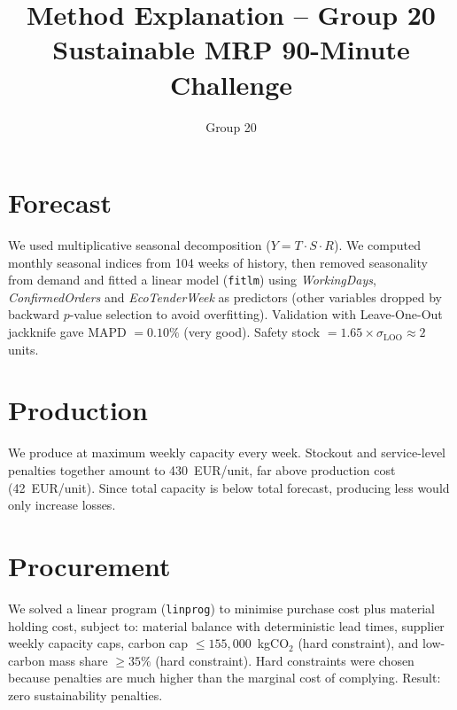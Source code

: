 \documentclass[11pt,a4paper]{article}
\title{Method Explanation -- Group 20\\
\large Sustainable MRP 90-Minute Challenge}
\author{Group 20}
\date{}
\begin{document}
\maketitle

\section*{Forecast}
We used multiplicative seasonal decomposition ($Y = T \cdot S \cdot R$).
We computed monthly seasonal indices from 104 weeks of history, then removed seasonality
from demand and fitted a linear model (\texttt{fitlm}) using \textit{WorkingDays},
\textit{ConfirmedOrders} and \textit{EcoTenderWeek} as predictors (other variables dropped
by backward $p$-value selection to avoid overfitting). Validation with Leave-One-Out
jackknife gave MAPD $= 0.10\%$ (very good). Safety stock $= 1.65 \times \sigma_{\text{LOO}} \approx 2$ units.

\section*{Production}
We produce at maximum weekly capacity every week. Stockout and service-level penalties
together amount to 430~EUR/unit, far above production cost (42~EUR/unit). Since total
capacity is below total forecast, producing less would only increase losses.

\section*{Procurement}
We solved a linear program (\texttt{linprog}) to minimise purchase cost plus material
holding cost, subject to: material balance with deterministic lead times, supplier weekly
capacity caps, carbon cap $\leq 155{,}000$~kgCO$_2$ (hard constraint), and low-carbon
mass share $\geq 35\%$ (hard constraint). Hard constraints were chosen because penalties
are much higher than the marginal cost of complying. Result: zero sustainability penalties.
\end{document}

